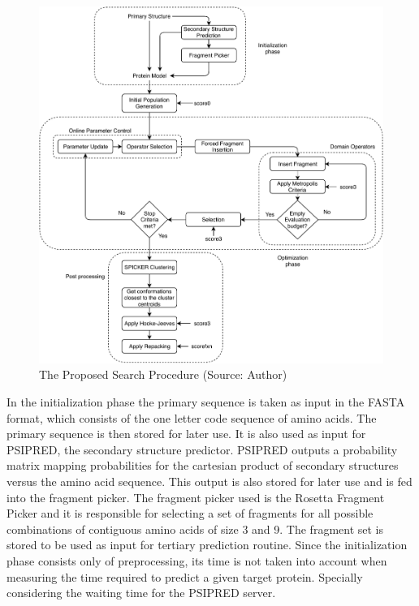 \begin{figure}
    \centering
    \includegraphics[width=\linewidth]{Figuras/search-procedure.pdf}
    \caption{The Proposed Search Procedure (Source: Author)}
    \label{fig:search-procedure}
\end{figure}

In the initialization phase the primary sequence is taken as input in the FASTA
format, which consists of the one letter code sequence of amino acids. The
primary sequence is then stored for later use. It is also used as input for
PSIPRED, the secondary structure predictor. PSIPRED outputs a probability
matrix mapping probabilities for the cartesian product of secondary structures
versus the amino acid sequence. This output is also stored for later use and is
fed into the fragment picker.  The fragment picker used is the Rosetta Fragment
Picker and it is responsible for selecting a set of fragments for all possible
combinations of contiguous amino acids of size 3 and 9. The fragment set is
stored to be used as input for tertiary prediction routine. Since the
initialization phase consists only of preprocessing, its time is not taken into
account when measuring the time required to predict a given target protein.
Specially considering the waiting time for the PSIPRED server.

